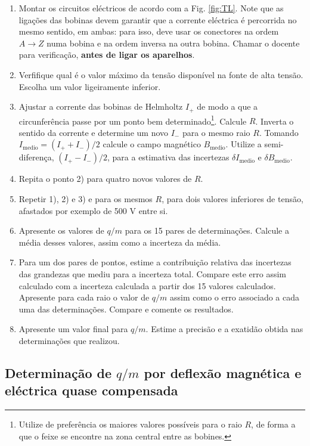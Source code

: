 \documentclass[a4paper,twoside,11pt]{report}      %
\begin{document}
\begin{enumerate}
	\item Montar os circuitos eléctricos de acordo com a  Fig. \ref{fig:TL}. Note que as ligações das bobinas devem garantir que a corrente eléctrica é percorrida no mesmo sentido, em ambas: para isso, deve usar os conectores na ordem $A\rightarrow Z$ numa bobina e na ordem inversa na outra bobina. Chamar o docente para verificação, \textbf{antes de ligar os aparelhos}.
	\item Verfifique qual é o valor máximo da tensão disponível na fonte de alta tensão. Escolha um valor ligeiramente inferior.
	\item Ajustar a corrente das bobinas de Helmholtz $I_+$ de modo a que a circunferência passe por um ponto bem determinado\footnote{Utilize de preferência os maiores valores possíveis para o raio $R$, de forma a que o feixe se encontre na zona central entre as bobines.}.  Calcule $R$.
	Inverta o sentido da corrente e determine um novo $I_-$ para o mesmo raio $R$.
	Tomando $I_{\textrm{medio}} = (I_+ + I_-)/2 $ calcule o campo magnético $B_{\textrm{medio}}$. Utilize a semi-diferença, $(I_+ - I_-)/2$, para a estimativa das incertezas $\delta I_{\textrm{medio}}$ e $\delta B_{\textrm{medio}}$.
	\item Repita o ponto 2) para quatro novos valores de $R$. 
	\item Repetir 1), 2) e 3)  e para os mesmos $R$, para dois valores inferiores de tensão, afastados por exemplo de 500 V entre si.
	\item Apresente os valores de $q/m$ para os 15 pares de determinações. Calcule a média desses valores, assim como a incerteza da média.
	\item Para um dos pares de pontos, estime a contribuição relativa das incertezas das grandezas que mediu para a incerteza total. Compare este erro assim calculado com a incerteza calculada a partir dos 15 valores calculados.
	Apresente para cada raio o valor de $q/m$ assim como o erro associado a cada uma das determinações. Compare e comente os resultados.
	\item Apresente um valor final para $q/m$. Estime a precisão e a exatidão obtida nas determinações que realizou.
\end{enumerate}
 
\subsection{\sf Determinação de $q/m$ por deflexão magnética e eléctrica quase compensada }
\end{document}
